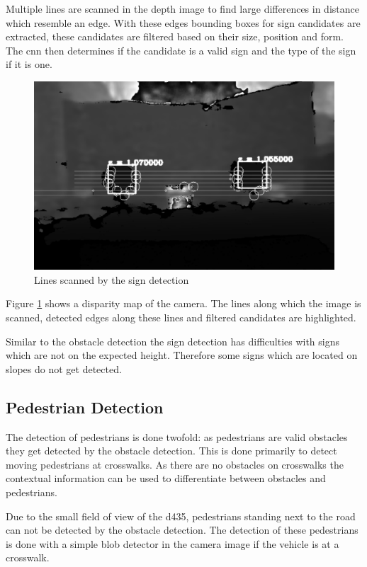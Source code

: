 Multiple lines are scanned in the depth image to find large differences in distance which resemble an edge.
With these edges bounding boxes for sign candidates are extracted, these candidates are filtered based on their size, position and form. The \ac{cnn} then determines if the candidate is a valid sign and the type of the sign if it is one.

\begin{figure}[h]
    \centering
    \includegraphics[width=\textwidth]{../Material/sign_depth_detection.png}
    \caption{Lines scanned by the sign detection}
    \label{fig:det:signScan}
\end{figure}

Figure \ref{fig:det:signScan} shows a disparity map of the camera. The lines along which the image is scanned, detected edges along these lines and filtered candidates are highlighted.

Similar to the obstacle detection the sign detection has difficulties with signs which are not on the expected height. Therefore some signs which are located on slopes do not get detected.

\subsection{Pedestrian Detection}
The detection of pedestrians is done twofold: as pedestrians are valid obstacles they get detected by the obstacle detection. 
This is done primarily to detect moving pedestrians at crosswalks. 
As there are no obstacles on crosswalks the contextual information can be used to differentiate between obstacles and pedestrians. 

Due to the small field of view of the \ac{d435}, pedestrians standing next to the road can not be detected by the obstacle detection. 
The detection of these pedestrians is done with a simple blob detector in the camera image if the vehicle is at a crosswalk.

